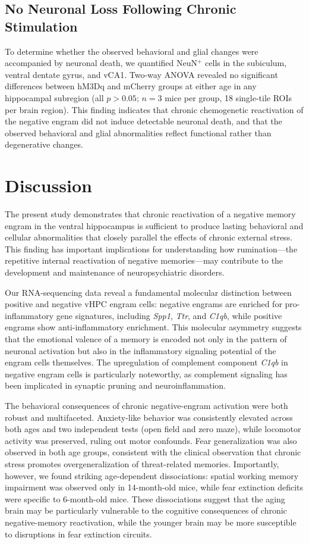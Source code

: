 \documentclass[11pt]{article}
\begin{document}
\subsection{No Neuronal Loss Following Chronic Stimulation}

To determine whether the observed behavioral and glial changes were accompanied by neuronal death, we quantified NeuN$^+$ cells in the subiculum, ventral dentate gyrus, and vCA1. Two-way ANOVA revealed no significant differences between hM3Dq and mCherry groups at either age in any hippocampal subregion (all $p > 0.05$; $n = 3$ mice per group, 18 single-tile ROIs per brain region). This finding indicates that chronic chemogenetic reactivation of the negative engram did not induce detectable neuronal death, and that the observed behavioral and glial abnormalities reflect functional rather than degenerative changes.

\section{Discussion}

The present study demonstrates that chronic reactivation of a negative memory engram in the ventral hippocampus is sufficient to produce lasting behavioral and cellular abnormalities that closely parallel the effects of chronic external stress. This finding has important implications for understanding how rumination---the repetitive internal reactivation of negative memories---may contribute to the development and maintenance of neuropsychiatric disorders.

Our RNA-sequencing data reveal a fundamental molecular distinction between positive and negative vHPC engram cells: negative engrams are enriched for pro-inflammatory gene signatures, including \textit{Spp1}, \textit{Ttr}, and \textit{C1qb}, while positive engrams show anti-inflammatory enrichment. This molecular asymmetry suggests that the emotional valence of a memory is encoded not only in the pattern of neuronal activation but also in the inflammatory signaling potential of the engram cells themselves. The upregulation of complement component \textit{C1qb} in negative engram cells is particularly noteworthy, as complement signaling has been implicated in synaptic pruning and neuroinflammation.

The behavioral consequences of chronic negative-engram activation were both robust and multifaceted. Anxiety-like behavior was consistently elevated across both ages and two independent tests (open field and zero maze), while locomotor activity was preserved, ruling out motor confounds. Fear generalization was also observed in both age groups, consistent with the clinical observation that chronic stress promotes overgeneralization of threat-related memories. Importantly, however, we found striking age-dependent dissociations: spatial working memory impairment was observed only in 14-month-old mice, while fear extinction deficits were specific to 6-month-old mice. These dissociations suggest that the aging brain may be particularly vulnerable to the cognitive consequences of chronic negative-memory reactivation, while the younger brain may be more susceptible to disruptions in fear extinction circuits.
\end{document}
